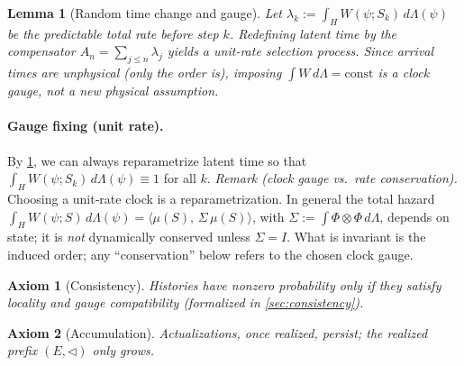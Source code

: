 \documentclass[12pt,a4paper]{article}
\newtheorem{axiom}{Axiom}
\newtheorem{lemma}{Lemma}
\begin{document}
\begin{lemma}[Random time change and gauge]\label{lem:time-change}
Let \(\lambda_k:=\int_H W(\psi;S_k)\,d\Lambda(\psi)\) be the predictable total rate before step \(k\).
Redefining latent time by the compensator \(A_n=\sum_{j\le n}\lambda_j\) yields a unit‑rate selection
process. Since arrival times are unphysical (only the order is), imposing \(\int W\,d\Lambda=\text{const}\)
is a clock gauge, not a new physical assumption.
\end{lemma}

\paragraph{Gauge fixing (unit rate).}
By \cref{lem:time-change}, we can always reparametrize latent time so that
\(\int_H W(\psi;S_k)\,d\Lambda(\psi)\equiv 1\) for all \(k\).
\emph{Remark (clock gauge vs.\ rate conservation).} Choosing a unit‑rate clock is a reparametrization.
In general the total hazard \(\int_H W(\psi;S)\,d\Lambda(\psi)=\langle \mu(S),\,\Sigma\,\mu(S)\rangle\), with
\(\Sigma:=\int \Phi\otimes \Phi\,d\Lambda\), depends on state; it is \emph{not} dynamically conserved unless
\(\Sigma=I\). What is invariant is the induced order; any “conservation” below refers to the chosen clock gauge.


\begin{axiom}[Consistency]\label{ax:consistency}
Histories have nonzero probability only if they satisfy locality and gauge compatibility (formalized in \cref{sec:consistency}).
\end{axiom}



\begin{axiom}[Accumulation]\label{ax:accumulation}
Actualizations, once realized, persist; the realized prefix $(E,\triangleleft)$ only grows.
\end{axiom}

\providecommand{\clref}[1]{\hyperref[cl:#1]{\textnormal{(CL#1)}}}
\end{document}
